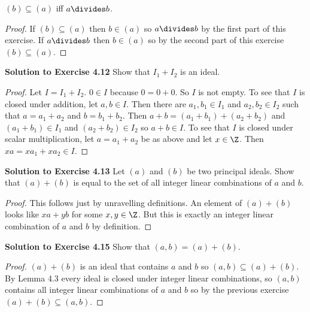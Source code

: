 \documentclass[oneside,12pt]{amsart}
\begin{document}
$(b)\subseteq (a)$ iff $a\divides b$.
\begin{proof}
If $(b)\subseteq (a)$ then $b\in (a)$ so $a\divides b$ by the first part of this exercise. If $a\divides b$ then $b\in (a)$ so by the second part of
this exercise $(b)\subseteq (a)$.
\end{proof}

\bigskip

\textbf{Solution to Exercise 4.12}  Show that $I_1+I_2$ is an ideal.
\begin{proof}
Let $I=I_1+I_2$. $0\in I$ because $0=0+0$. So $I$ is not empty. To see that $I$ is closed under addition,
let $a,b\in I$. Then there are $a_1,b_1\in I_1$ and $a_2,b_2\in I_2$ such that $a=a_1+a_2$ and $b=b_1+b_2$.
Then $a+b = (a_1+b_1) + (a_2 + b_2)$ and $(a_1+b_1)\in I_1$ and $(a_2+b_2)\in I_2$ so $a+b\in I$.
To see that $I$ is closed under scalar multiplication, let $a=a_1+a_2$ be as above and let $x\in\Z$.
Then $xa=xa_1+xa_2\in I$.
\end{proof}

\bigskip

\textbf{Solution to Exercise 4.13}  Let $(a)$ and $(b)$ be two principal ideals. Show that $(a)+(b)$ is equal to the set of all integer linear combinations of $a$ and $b$.
\begin{proof}
This follows just by unravelling definitions. An element of $(a)+(b)$ looks like $xa+yb$ for some $x,y\in\Z$.
But this is exactly an integer linear combination of $a$ and $b$ by definition.
\end{proof}

\bigskip

\textbf{Solution to Exercise 4.15}  Show that $(a,b)=(a)+(b)$.
\begin{proof}
$(a)+(b)$ is an ideal that contains $a$ and $b$ so $(a,b)\subseteq(a)+(b)$. By Lemma 4.3 every ideal
is closed under integer linear combinations, so $(a,b)$ contains all integer linear combinations of $a$ and $b$
so by the previous exercise $(a)+(b)\subseteq (a,b)$.
\end{proof}
\end{document}
